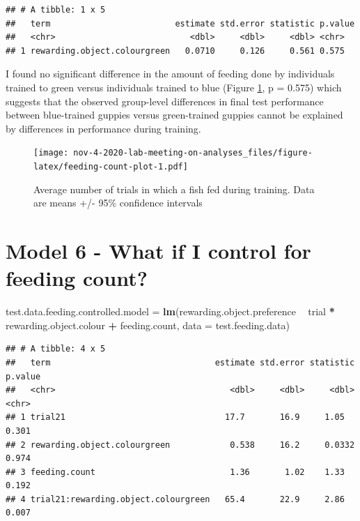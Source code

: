 \documentclass[]{book}
\newenvironment{Shaded}{\begin{snugshade}}{\end{snugshade}}
\newcommand{\KeywordTok}[1]{\textcolor[rgb]{0.13,0.29,0.53}{\textbf{#1}}}
\newcommand{\DataTypeTok}[1]{\textcolor[rgb]{0.13,0.29,0.53}{#1}}
\newcommand{\StringTok}[1]{\textcolor[rgb]{0.31,0.60,0.02}{#1}}
\newcommand{\OperatorTok}[1]{\textcolor[rgb]{0.81,0.36,0.00}{\textbf{#1}}}
\newcommand{\NormalTok}[1]{#1}
\begin{document}
\begin{verbatim}
## # A tibble: 1 x 5
##   term                         estimate std.error statistic p.value
##   <chr>                           <dbl>     <dbl>     <dbl> <chr>  
## 1 rewarding.object.colourgreen   0.0710     0.126     0.561 0.575
\end{verbatim}

I found no significant difference in the amount of feeding done by
individuals trained to green versus individuals trained to blue (Figure
\ref{fig:feeding-count-plot}, p = 0.575) which suggests that the
observed group-level differences in final test performance between
blue-trained guppies versus green-trained guppies cannot be explained by
differences in performance during training.

\begin{figure}
\centering
\texttt{[image: nov-4-2020-lab-meeting-on-analyses\_files/figure-latex/feeding-count-plot-1.pdf]}
\caption{\label{fig:feeding-count-plot}Average number of trials in which a
fish fed during training. Data are means +/- 95\% confidence intervals}
\end{figure}

\chapter{Model 6 - What if I control for feeding
count?}\label{model-6---what-if-i-control-for-feeding-count}

\begin{Shaded}
\begin{Highlighting}[]
\NormalTok{test.data.feeding.controlled.model =}\StringTok{ }
\StringTok{  }\KeywordTok{lm}\NormalTok{(rewarding.object.preference }\OperatorTok{~}\StringTok{ }\NormalTok{trial }\OperatorTok{*}\StringTok{ }\NormalTok{rewarding.object.colour }\OperatorTok{+}\StringTok{ }\NormalTok{feeding.count, }
     \DataTypeTok{data =}\NormalTok{ test.feeding.data)}
\end{Highlighting}
\end{Shaded}

\begin{verbatim}
## # A tibble: 4 x 5
##   term                                 estimate std.error statistic p.value
##   <chr>                                   <dbl>     <dbl>     <dbl> <chr>  
## 1 trial21                                17.7       16.9     1.05   0.301  
## 2 rewarding.object.colourgreen            0.538     16.2     0.0332 0.974  
## 3 feeding.count                           1.36       1.02    1.33   0.192  
## 4 trial21:rewarding.object.colourgreen   65.4       22.9     2.86   0.007
\end{verbatim}
\end{document}
